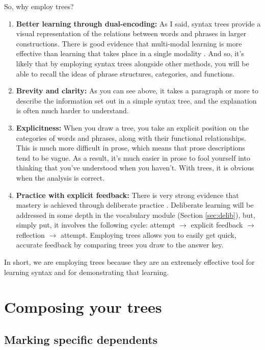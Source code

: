 So, why employ trees?

\begin{enumerate}[noitemsep]
    \item \textbf{Better learning through dual-encoding:} As I said, syntax trees provide a visual representation of the relations between words and phrases in larger constructions. There is good evidence that multi-modal learning is more effective than learning that takes place in a single modality \citep{ginns2005}. And so, it's likely that by employing syntax trees alongside other methods, you will be able to recall the ideas of phrase structures, categories, and functions.
    \item \textbf{Brevity and clarity:} As you can see above, it takes a paragraph or more to describe the information set out in a simple syntax tree, and the explanation is often much harder to understand.
    \item \textbf{Explicitness:} When you draw a tree, you take an explicit position on the categories of words and phrases, along with their functional relationships. This is much more difficult in prose, which means that prose descriptions tend to be vague. As a result, it's much easier in prose to fool yourself into thinking that you've understood when you haven't. With trees, it is obvious when the analysis is correct.
    \item \textbf{Practice with explicit feedback:} There is very strong evidence that mastery is achieved through deliberate practice \citep{ericsson1993}. Deliberate learning will be addressed in some depth in the vocabulary module (Section \ref{sec:delib}), but, simply put, it involves the following cycle: attempt $\rightarrow$ explicit feedback $\rightarrow$ reflection $\rightarrow$ attempt. Employing trees allows you to easily get quick, accurate feedback by comparing trees you draw to the answer key.
\end{enumerate}

\noindent In short, we are employing trees because they are an extremely effective tool for learning syntax and for demonstrating that learning.

\section{Composing your trees}

\subsection{Marking specific dependents}\label{sec:MardDeps}


